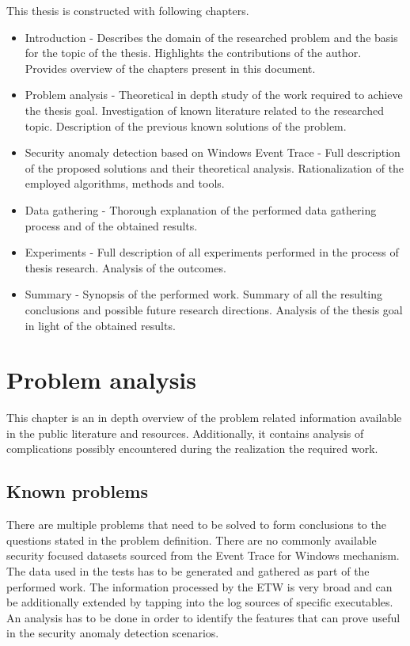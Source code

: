 \documentclass[a4paper,twoside,12pt]{book}
\begin{document}
This thesis is constructed with following chapters.
\begin{itemize}
	\item Introduction - Describes the domain of the researched problem and the basis for the 
	topic of the thesis. Highlights the contributions of the author. Provides overview of the 
	chapters present in this document.
	\item Problem analysis - Theoretical in depth study of the work required to achieve the thesis
	goal. Investigation of known literature related to the researched topic. Description of the 
	previous known solutions of the problem. 
	\item Security anomaly detection based on Windows Event Trace - Full description of the proposed
	solutions and their theoretical analysis. Rationalization of the employed algorithms, methods 
	and tools.
	\item Data gathering - Thorough explanation of the performed data gathering process and of 
	the obtained results.
 	\item Experiments - Full description of all experiments performed in the process of thesis 
 	research. Analysis of the outcomes.
	\item Summary - Synopsis of the performed work. Summary of all the resulting conclusions and 
	possible future research directions. Analysis of the thesis goal in light of the obtained
	results. 
\end{itemize}

\chapter{Problem analysis}

This chapter is an in depth overview of the problem related information available in the public 
literature and resources. Additionally, it contains analysis of complications possibly encountered
during the realization the required work.  

\section{Known problems}
There are multiple problems that need to be solved to form conclusions to the questions stated in the
problem definition.
There are no commonly available security focused datasets sourced from the Event Trace for 
Windows mechanism. The data used in the tests has to be generated and gathered as part of the
performed work. The information processed by the ETW is very broad and can be additionally extended 
by tapping into the log sources of specific executables.
An analysis has to be done in order to identify the features that can prove useful in the security
anomaly detection scenarios. 
\end{document}
